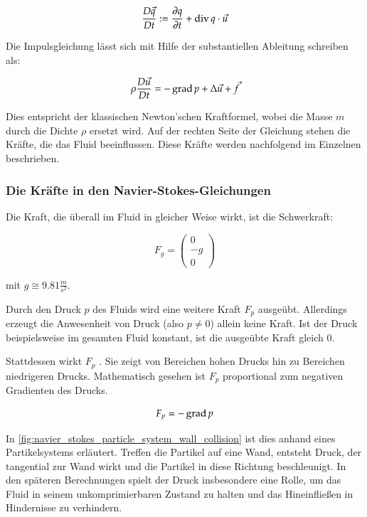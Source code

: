 \begin{equation}
\frac{
	D\vec{q}}
{
	Dt
} :=
\frac{
	\partial q
}
{
	\partial t
}
+
\operatorname*{div} q \cdot
\vec{u}
\end{equation}

Die Impulsgleichung lässt sich mit Hilfe der substantiellen Ableitung
schreiben als:

\begin{equation}
\rho \frac{D\vec{u}}{Dt} = - \operatorname*{grad} p + \Delta \vec{u} + \vec{f}
\end{equation}

Dies entspricht der klassischen Newton'schen Kraftformel, wobei die
Masse $m$ durch die Dichte $\rho$ ersetzt wird. Auf der rechten Seite
der Gleichung stehen die Kräfte, die das Fluid beeinflussen. Diese
Kräfte werden nachfolgend im Einzelnen beschrieben.

\subsubsection{Die Kräfte in den Navier-Stokes-Gleichungen}

Die Kraft, die überall im Fluid in gleicher Weise wirkt, ist die Schwerkraft:

\begin{equation}
F_g =
\left(
\begin{array}{c}
0 \\
-g \\
0
\end{array}
\right)
\end{equation}

mit $g \cong 9.81 \frac{m}{s^2}$.

Durch den Druck $p$ des Fluids wird eine weitere Kraft $F_p$ ausgeübt.
Allerdings erzeugt die Anwesenheit von Druck (also $p \neq 0$) allein
keine Kraft. Ist der Druck beispielsweise im gesamten Fluid konstant,
ist die ausgeübte Kraft gleich 0.

Stattdessen wirkt $F_p$ . Sie zeigt von
Bereichen hohen Drucks hin zu Bereichen niedrigeren
Drucks. Mathematisch gesehen ist $F_p$ proportional zum negativen
Gradienten des Drucks.

\begin{equation}
\label{eq:navier_stokes_f_p}
F_p = -\operatorname*{grad} p
\end{equation}

In \cref{fig:navier_stokes_particle_system_wall_collision} ist
dies anhand eines Partikelsystems erläutert. Treffen die
Partikel auf eine Wand, entsteht Druck, der tangential zur Wand wirkt
und die Partikel in diese Richtung beschleunigt. In den späteren
Berechnungen spielt der Druck insbesondere eine Rolle, um das Fluid in
seinem unkomprimierbaren Zustand zu halten und das Hineinfließen in
Hindernisse zu verhindern.

